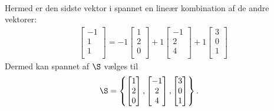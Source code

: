 \begin{eks}
\begin{align*}
%
\end{align*}
%
Hermed er den sidste vektor i spannet en lineær kombination af de andre vektorer:
%
  \begin{align*}
    \begin{bmatrix}
           -1 \\
           1 \\
           1 \\
         \end{bmatrix}
         = 
         -1 \begin{bmatrix}
           1 \\
           2 \\
           0 \\
         \end{bmatrix}
         +1
         \begin{bmatrix}
           -1 \\
           2 \\
           4 \\
         \end{bmatrix}
          +1
         \begin{bmatrix}
           3 \\
           0 \\
           1 \\
         \end{bmatrix}
  \end{align*} 
%
Dermed kan spannet af $\S$ vælges til
%
\begin{align*}
\S &= \left\{
\begin{bmatrix}
           1 \\
           2 \\
           0 \\
\end{bmatrix}
,
\begin{bmatrix}
           -1 \\
           2 \\
           4 \\
\end{bmatrix}
,
\begin{bmatrix}
           3 \\
           0 \\
           1 \\
\end{bmatrix}
\right\}.
\end{align*}
\end{eks}
%
